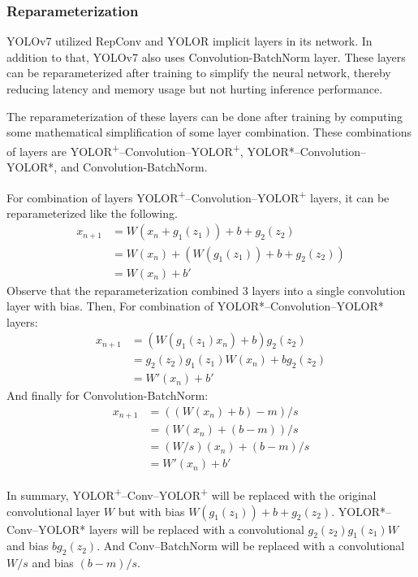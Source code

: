   \subsubsection{Reparameterization}
  YOLOv7 utilized RepConv and YOLOR implicit layers in its network.
  In addition to that, YOLOv7 also uses Convolution-BatchNorm layer.
  These layers can be reparameterized after training to simplify the neural network, thereby reducing
  latency and memory usage but not hurting inference performance. 

  The reparameterization of these layers can be done after training by computing
  some mathematical simplification of some layer combination.
  These combinations of layers are YOLOR\textsuperscript{+}--Convolution--YOLOR\textsuperscript{+}, 
  YOLOR*--Convolution--YOLOR*, and Convolution-BatchNorm.

  For combination of layers YOLOR\textsuperscript{+}--Convolution--YOLOR\textsuperscript{+} layers, it can be reparameterized like the following.
  \begin{align*}
    x_{n+1} &= W(x_{n}+g_1(z_1)) + b + g_2(z_2)\\
    &= W(x_{n}) + (W(g_1(z_1)) + b + g_2(z_2))\\
    &= W(x_{n}) + b'
  \end{align*}
  Observe that the reparameterization combined 3 layers into a single convolution layer with bias. 
  Then, For combination of YOLOR*--Convolution--YOLOR* layers:
  \begin{align*}
    x_{n+1} &= (W(g_1(z_1)x_n)+b)g_2(z_2)\\
    &= g_2(z_2)g_1(z_1)W(x_n) + b g_2(z_2)\\
    &= W'(x_n) + b'
  \end{align*}
  And finally for Convolution-BatchNorm:
  \begin{align*}
    x_{n+1} &= ((W(x_n)+b)-m)/s\\
    &= (W(x_n) + (b-m))/s\\
    &= (W/s)(x_n) + (b-m)/s\\
    &= W'(x_n) + b'
  \end{align*}

  In summary, YOLOR\textsuperscript{+}--Conv--YOLOR\textsuperscript{+} will be replaced with the original convolutional layer $W$ but with bias $W(g_1(z_1)) + b + g_2(z_2)$.
  YOLOR*--Conv--YOLOR* layers will be replaced with a convolutional $g_2(z_2)g_1(z_1)W$ and bias $b g_2(z_2)$.
  And Conv--BatchNorm will be replaced with a convolutional $W/s$ and bias $(b-m)/s$.
  

